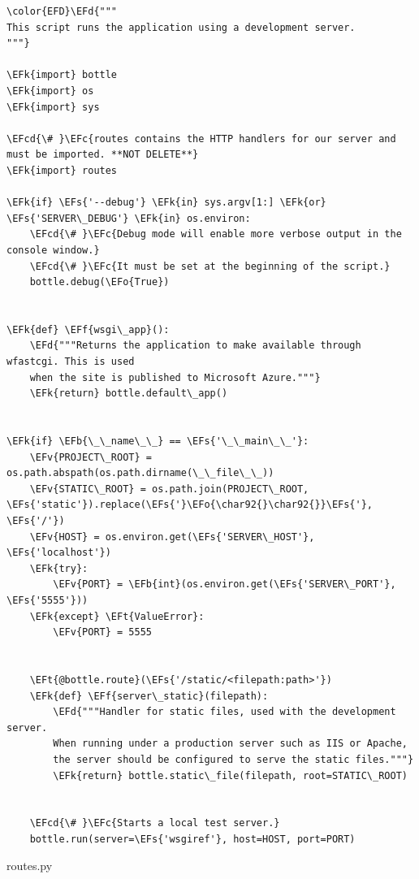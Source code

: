 \documentclass[14pt]{extarticle}
\newcommand{\EFc}[1]{\textcolor{EFc}{#1}} %
\newcommand{\EFcd}[1]{\textcolor{EFcd}{#1}} %
\newcommand{\EFs}[1]{\textcolor{EFs}{#1}} %
\newcommand{\EFd}[1]{\textcolor{EFd}{#1}} %
\newcommand{\EFk}[1]{\textcolor{EFk}{#1}} %
\newcommand{\EFb}[1]{\textcolor{EFb}{#1}} %
\newcommand{\EFf}[1]{\textcolor{EFf}{#1}} %
\newcommand{\EFv}[1]{\textcolor{EFv}{#1}} %
\newcommand{\EFt}[1]{\textcolor{EFt}{#1}} %
\newcommand{\EFo}[1]{\textcolor{EFo}{#1}} %
\begin{document}
\begin{Code}
\begin{Verbatim}
\color{EFD}\EFd{"""
This script runs the application using a development server.
"""}

\EFk{import} bottle
\EFk{import} os
\EFk{import} sys

\EFcd{\# }\EFc{routes contains the HTTP handlers for our server and must be imported. **NOT DELETE**}
\EFk{import} routes

\EFk{if} \EFs{'--debug'} \EFk{in} sys.argv[1:] \EFk{or} \EFs{'SERVER\_DEBUG'} \EFk{in} os.environ:
    \EFcd{\# }\EFc{Debug mode will enable more verbose output in the console window.}
    \EFcd{\# }\EFc{It must be set at the beginning of the script.}
    bottle.debug(\EFo{True})


\EFk{def} \EFf{wsgi\_app}():
    \EFd{"""Returns the application to make available through wfastcgi. This is used
    when the site is published to Microsoft Azure."""}
    \EFk{return} bottle.default\_app()


\EFk{if} \EFb{\_\_name\_\_} == \EFs{'\_\_main\_\_'}:
    \EFv{PROJECT\_ROOT} = os.path.abspath(os.path.dirname(\_\_file\_\_))
    \EFv{STATIC\_ROOT} = os.path.join(PROJECT\_ROOT, \EFs{'static'}).replace(\EFs{'}\EFo{\char92{}\char92{}}\EFs{'}, \EFs{'/'})
    \EFv{HOST} = os.environ.get(\EFs{'SERVER\_HOST'}, \EFs{'localhost'})
    \EFk{try}:
        \EFv{PORT} = \EFb{int}(os.environ.get(\EFs{'SERVER\_PORT'}, \EFs{'5555'}))
    \EFk{except} \EFt{ValueError}:
        \EFv{PORT} = 5555


    \EFt{@bottle.route}(\EFs{'/static/<filepath:path>'})
    \EFk{def} \EFf{server\_static}(filepath):
        \EFd{"""Handler for static files, used with the development server.
        When running under a production server such as IIS or Apache,
        the server should be configured to serve the static files."""}
        \EFk{return} bottle.static\_file(filepath, root=STATIC\_ROOT)


    \EFcd{\# }\EFc{Starts a local test server.}
    bottle.run(server=\EFs{'wsgiref'}, host=HOST, port=PORT)
\end{Verbatim}
\end{Code}

routes.py
\end{document}
